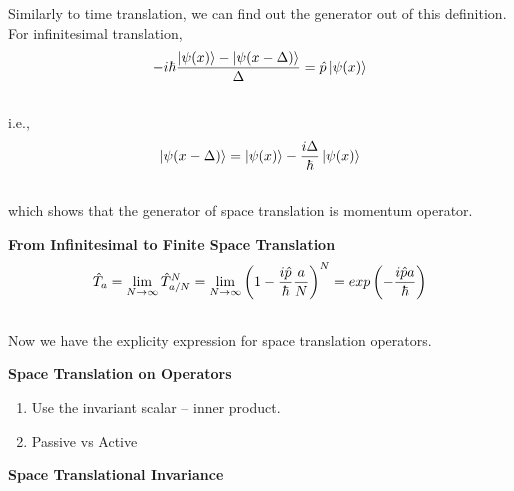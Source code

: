 \documentclass[letterpaper,10pt,english]{sphinxmanual}
\newcommand{\ket}[1]{\left| #1\right\rangle}
\begin{document}
Similarly to time translation, we can find out the generator out of this definition. For infinitesimal translation,
\begin{gather}
\begin{split}-i\hbar \frac{\ket{\psi(x)} - \ket{\psi(x - \Delta)}}{\Delta} = \hat p \ket{\psi(x)}\end{split}\notag\\\begin{split}\end{split}\notag
\end{gather}
i.e.,
\begin{gather}
\begin{split}\ket{\psi(x-\Delta)} = \ket{\psi(x)} - \frac{i\Delta}{\hbar} \ket{\psi(x)}\end{split}\notag\\\begin{split}\end{split}\notag
\end{gather}
which shows that the generator of space translation is momentum operator.

\textbf{From Infinitesimal to Finite Space Translation}
\begin{gather}
\begin{split}\hat T_a = \lim _ {N\rightarrow \infty} \hat T _ {a/N} ^ N = \lim _{N\rightarrow\infty} \left( 1 - \frac{i\hat p}{\hbar} \frac{a}{N} \right)^N = exp\left( -\frac{i \hat p a}{\hbar} \right)\end{split}\notag\\\begin{split}\end{split}\notag
\end{gather}
Now we have the explicity expression for space translation operators.

\textbf{Space Translation on Operators}
\begin{enumerate}
\item {} 
Use the invariant scalar -- inner product.

\item {} 
Passive vs Active

\end{enumerate}

\textbf{Space Translational Invariance}
\end{document}
